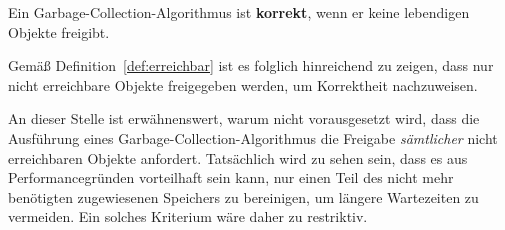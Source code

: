 \begin{mybox}
\begin{defn}
	Ein Garbage-Collection-Algorithmus ist \textbf{korrekt}, wenn er keine lebendigen Objekte freigibt.
\end{defn}
\end{mybox}

Gemäß Definition~\ref{def:erreichbar} ist es folglich hinreichend zu zeigen, dass nur nicht erreichbare Objekte freigegeben werden, um Korrektheit nachzuweisen.

An dieser Stelle ist erwähnenswert, warum nicht vorausgesetzt wird, dass die Ausführung eines Garbage-Collection-Algorithmus die Freigabe \textit{sämtlicher} nicht erreichbaren Objekte anfordert.
Tatsächlich wird zu sehen sein, dass es aus Performancegründen vorteilhaft sein kann, nur einen Teil des nicht mehr benötigten zugewiesenen Speichers zu bereinigen, um längere Wartezeiten zu vermeiden.
Ein solches Kriterium wäre daher zu restriktiv.